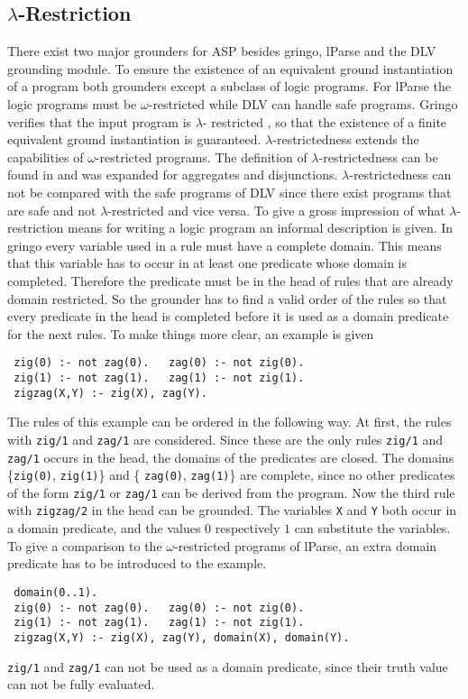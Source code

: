 \documentclass[a4paper,10pt]{article}
\begin{document}
\subsection{$\lambda$-Restriction}
\label{domainrestricted}
There exist two major grounders for ASP besides gringo, lParse \cite{lparseManual} and  the DLV grounding module\cite{DLV}.
To ensure the existence of an equivalent ground instantiation of a program both grounders except a subclass of logic programs. For lParse the logic programs must be $\omega$-restricted\cite{omega} while DLV can handle safe programs\cite{safe}.
Gringo verifies that the input program is $\lambda$-
restricted \cite{gringopaper}, so that the existence of a finite equivalent ground instantiation is guaranteed. 
$\lambda$-restrictedness extends the capabilities of $\omega$-restricted programs. The definition of $\lambda$-restrictedness can be found in \cite{gringopaper} and was expanded for aggregates and disjunctions.
$\lambda$-restrictedness can not be compared with the safe programs of DLV since there exist programs that are safe and not $\lambda$-restricted and vice versa.
\newline
To give a gross impression of what $\lambda$-restriction means for writing a logic program an informal description is given.
In gringo every variable used in a rule must have a complete domain. This means that this variable has to occur in at least one predicate whose domain is completed. Therefore the predicate must be in the head of rules that are already domain restricted. So the grounder has to find a valid order of the rules so that every predicate in the head is completed before it is used as a domain predicate for the next rules.
To make things more clear, an example is given
\begin{verbatim}
 zig(0) :- not zag(0).   zag(0) :- not zig(0).
 zig(1) :- not zag(1).   zag(1) :- not zig(1).
 zigzag(X,Y) :- zig(X), zag(Y).
\end{verbatim}
The rules of this example can be ordered in the following way.
At first, the rules with \texttt{zig/1} and \texttt{zag/1} are considered.
Since these are the only rules \texttt{zig/1} and \texttt{zag/1} occurs in the head, the domains of the predicates are closed. The domains \{\texttt{zig(0)}, \texttt{zig(1)}\} and \{ \texttt{zag(0)}, \texttt{zag(1)}\} are complete, since no other predicates of the form \texttt{zig/1} or \texttt{zag/1} can be derived from the program.
Now the third rule with \texttt{zigzag/2} in the head can be grounded. The variables \texttt{X} and \texttt{Y} both occur in a domain predicate, and the values $0$ respectively $1$ can substitute the variables.
\newline
To give a comparison to the $\omega$-restricted programs of lParse, an extra domain predicate has to be introduced to the example.
\begin{verbatim}
 domain(0..1).
 zig(0) :- not zag(0).   zag(0) :- not zig(0).
 zig(1) :- not zag(1).   zag(1) :- not zig(1).
 zigzag(X,Y) :- zig(X), zag(Y), domain(X), domain(Y).
\end{verbatim}
\texttt{zig/1} and \texttt{zag/1} can not be used as a domain predicate, since their truth value can not be fully evaluated.
\end{document}
